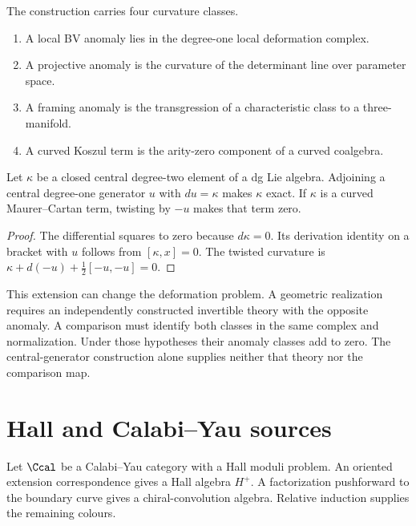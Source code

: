 The construction carries four curvature classes.
\begin{enumerate}
\item A local BV anomaly lies in the degree-one local deformation complex.
\item A projective anomaly is the curvature of the determinant line over parameter space.
\item A framing anomaly is the transgression of a characteristic class to a three-manifold.
\item A curved Koszul term is the arity-zero component of a curved coalgebra.
\end{enumerate}

\begin{theorem}
Let $\kappa$ be a closed central degree-two element of a dg Lie
algebra. Adjoining a central degree-one generator $u$ with
$du=\kappa$ makes $\kappa$ exact.
If $\kappa$ is a curved Maurer--Cartan term, twisting by $-u$
makes that term zero.
\end{theorem}
\begin{proof}
The differential squares to zero because $d\kappa=0$.
Its derivation identity on a bracket with $u$ follows from
$[\kappa,x]=0$.
The twisted curvature is
$\kappa+d(-u)+\frac12[-u,-u]=0$.
\end{proof}

This extension can change the deformation problem.
A geometric realization requires an independently constructed
invertible theory with the opposite anomaly.
A comparison must identify both classes in the same complex and normalization.
Under those hypotheses their anomaly classes add to zero.
The central-generator construction alone supplies neither that theory
nor the comparison map.

\chapter{Hall and Calabi--Yau sources}
Let $\Ccal$ be a Calabi--Yau category with a Hall moduli problem.  An oriented extension correspondence gives a Hall algebra $H^+$.  A factorization pushforward to the boundary curve gives a chiral-convolution algebra.  Relative induction supplies the remaining colours.


